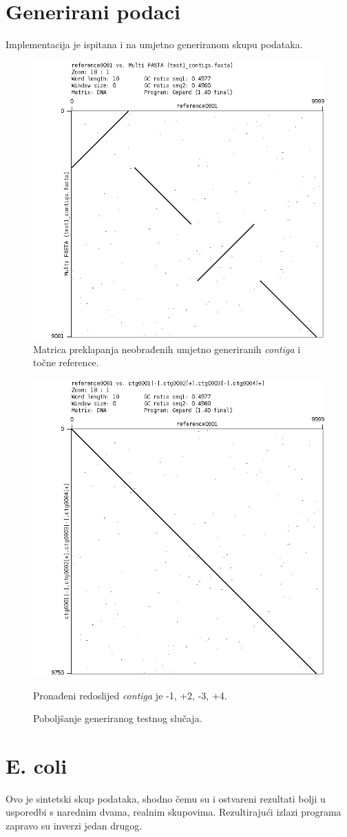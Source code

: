 \documentclass[times, utf8, seminar, numeric]{fer}
\begin{document}
\section{Generirani podaci}
Implementacija je ispitana i na umjetno generiranom skupu podataka.

\begin{figure}[h]
	\centering
	\centerline{\includegraphics[width=0.6\linewidth]{img/generated}}
	\caption{Matrica preklapanja neobrađenih umjetno generiranih \textit{contiga} i točne reference.}
	\label{fig:generated}
\end{figure}

\begin{figure}[h]
	\centering
	\centerline{\includegraphics[width=0.6\linewidth]{img/generated_reference}}
	\caption{Poboljšanje generiranog testnog slučaja.}
	\label{fig:generatedreference}
	\small
	Pronađeni redoslijed \textit{contiga} je -1, +2, -3, +4.
\end{figure}



\section{E. coli}
Ovo je sintetski skup podataka, shodno čemu su i ostvareni rezultati bolji u usporedbi s narednim dvama, realnim skupovima. Rezultirajući izlazi programa zapravo su inverzi jedan drugog.
\end{document}

